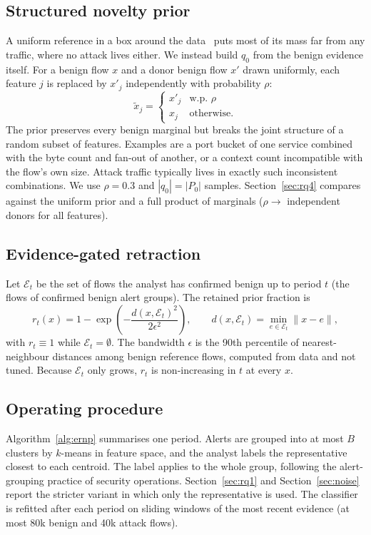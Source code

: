 \documentclass[preprint,12pt]{elsarticle}
\newcommand{\E}{\mathcal{E}}
\begin{document}
\subsection{Structured novelty prior}\label{sec:prior}
A uniform reference in a box around the data~\cite{sipple2020negative} puts most of its mass far from any traffic, where no attack lives either. We instead build $q_0$ from the benign evidence itself. For a benign flow $x$ and a donor benign flow $x'$ drawn uniformly, each feature $j$ is replaced by $x'_j$ independently with probability $\rho$:
\begin{equation}
\tilde x_j = \begin{cases} x'_j & \text{w.p. } \rho\\ x_j & \text{otherwise.}\end{cases}
\end{equation}
The prior preserves every benign marginal but breaks the joint structure of a random subset of features. Examples are a port bucket of one service combined with the byte count and fan-out of another, or a context count incompatible with the flow's own size. Attack traffic typically lives in exactly such inconsistent combinations. We use $\rho=0.3$ and $|q_0|=|P_0|$ samples. Section~\ref{sec:rq4} compares against the uniform prior and a full product of marginals ($\rho\to$ independent donors for all features).

\subsection{Evidence-gated retraction}\label{sec:retraction}
Let $\E_t$ be the set of flows the analyst has confirmed benign up to period $t$ (the flows of confirmed benign alert groups). The retained prior fraction is
\begin{equation}
r_t(x) = 1-\exp\!\left(-\frac{d(x,\E_t)^2}{2\epsilon^2}\right),\qquad d(x,\E_t)=\min_{e\in\E_t}\|x-e\|,\label{eq:retain}
\end{equation}
with $r_t\equiv1$ while $\E_t=\emptyset$. The bandwidth $\epsilon$ is the 90th percentile of nearest-neighbour distances among benign reference flows, computed from data and not tuned. Because $\E_t$ only grows, $r_t$ is non-increasing in $t$ at every $x$.

\subsection{Operating procedure}
Algorithm~\ref{alg:ernp} summarises one period. Alerts are grouped into at most $B$ clusters by $k$-means in feature space, and the analyst labels the representative closest to each centroid. The label applies to the whole group, following the alert-grouping practice of security operations. Section~\ref{sec:rq1} and Section~\ref{sec:noise} report the stricter variant in which only the representative is used. The classifier is refitted after each period on sliding windows of the most recent evidence (at most 80k benign and 40k attack flows).
\end{document}
